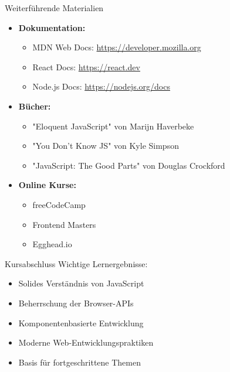 \begin{concept}{Weiterführende Materialien}
    \begin{itemize}
        \item \textbf{Dokumentation:}
            \begin{itemize}
                \item MDN Web Docs: \url{https://developer.mozilla.org}
                \item React Docs: \url{https://react.dev}
                \item Node.js Docs: \url{https://nodejs.org/docs}
            \end{itemize}
        \item \textbf{Bücher:}
            \begin{itemize}
                \item "Eloquent JavaScript" von Marijn Haverbeke
                \item "You Don't Know JS" von Kyle Simpson
                \item "JavaScript: The Good Parts" von Douglas Crockford
            \end{itemize}
        \item \textbf{Online Kurse:}
            \begin{itemize}
                \item freeCodeCamp
                \item Frontend Masters
                \item Egghead.io
            \end{itemize}
    \end{itemize}
\end{concept}

\begin{theorem}{Kursabschluss}
    Wichtige Lernergebnisse:
    \begin{itemize}
        \item Solides Verständnis von JavaScript
        \item Beherrschung der Browser-APIs
        \item Komponentenbasierte Entwicklung
        \item Moderne Web-Entwicklungspraktiken
        \item Basis für fortgeschrittene Themen
    \end{itemize}
\end{theorem}
